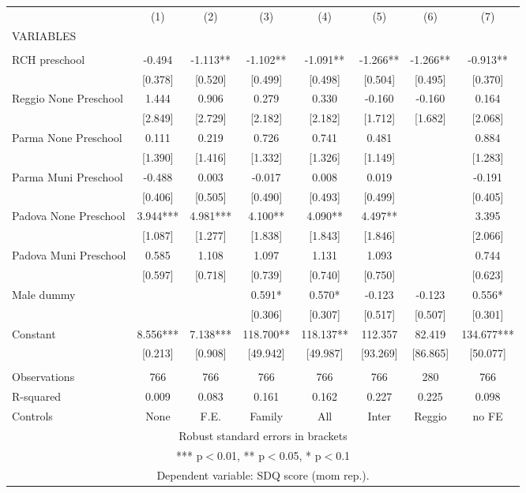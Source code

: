 \begin{tabular}{lccccccc} \hline
 & (1) & (2) & (3) & (4) & (5) & (6) & (7) \\
VARIABLES &  &  &  &  &  &  &  \\ \hline
 &  &  &  &  &  &  &  \\
RCH preschool & -0.494 & -1.113** & -1.102** & -1.091** & -1.266** & -1.266** & -0.913** \\
 & [0.378] & [0.520] & [0.499] & [0.498] & [0.504] & [0.495] & [0.370] \\
Reggio None Preschool & 1.444 & 0.906 & 0.279 & 0.330 & -0.160 & -0.160 & 0.164 \\
 & [2.849] & [2.729] & [2.182] & [2.182] & [1.712] & [1.682] & [2.068] \\
Parma None Preschool & 0.111 & 0.219 & 0.726 & 0.741 & 0.481 &  & 0.884 \\
 & [1.390] & [1.416] & [1.332] & [1.326] & [1.149] &  & [1.283] \\
Parma Muni Preschool & -0.488 & 0.003 & -0.017 & 0.008 & 0.019 &  & -0.191 \\
 & [0.406] & [0.505] & [0.490] & [0.493] & [0.499] &  & [0.405] \\
Padova None Preschool & 3.944*** & 4.981*** & 4.100** & 4.090** & 4.497** &  & 3.395 \\
 & [1.087] & [1.277] & [1.838] & [1.843] & [1.846] &  & [2.066] \\
Padova Muni Preschool & 0.585 & 1.108 & 1.097 & 1.131 & 1.093 &  & 0.744 \\
 & [0.597] & [0.718] & [0.739] & [0.740] & [0.750] &  & [0.623] \\
Male dummy &  &  & 0.591* & 0.570* & -0.123 & -0.123 & 0.556* \\
 &  &  & [0.306] & [0.307] & [0.517] & [0.507] & [0.301] \\
Constant & 8.556*** & 7.138*** & 118.700** & 118.137** & 112.357 & 82.419 & 134.677*** \\
 & [0.213] & [0.908] & [49.942] & [49.987] & [93.269] & [86.865] & [50.077] \\
 &  &  &  &  &  &  &  \\
Observations & 766 & 766 & 766 & 766 & 766 & 280 & 766 \\
R-squared & 0.009 & 0.083 & 0.161 & 0.162 & 0.227 & 0.225 & 0.098 \\
 Controls & None & F.E. & Family & All & Inter & Reggio & no FE \\ \hline
\multicolumn{8}{c}{ Robust standard errors in brackets} \\
\multicolumn{8}{c}{ *** p$<$0.01, ** p$<$0.05, * p$<$0.1} \\
\multicolumn{8}{c}{ Dependent variable: SDQ score (mom rep.).} \\
\end{tabular}
